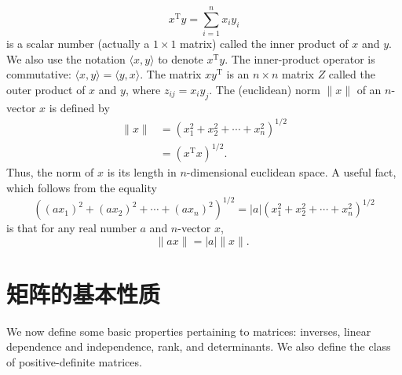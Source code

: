 \documentclass[lang=cn,newtx,10pt,scheme=chinese]{elegantbook}
\begin{document}
$$
x^{\mathrm{T}} y=\sum_{i=1}^n x_i y_i
$$
is a scalar number (actually a $1 \times 1$ matrix) called the inner product of $x$ and $y$. We also use the notation $\langle x, y\rangle$ to denote $x^{\mathrm{T}} y$. The inner-product operator is commutative: $\langle x, y\rangle=\langle y, x\rangle$. The matrix $x y^{\mathrm{T}}$ is an $n \times n$ matrix $Z$ called the outer product of $x$ and $y$, where $z_{i j}=x_i y_j$. The (euclidean) norm $\|x\|$ of an $n$-vector $x$ is defined by
$$
\begin{aligned}
\|x\| & =\left(x_1^2+x_2^2+\cdots+x_n^2\right)^{1 / 2} \\
& =\left(x^{\mathrm{T}} x\right)^{1 / 2} .
\end{aligned}
$$
Thus, the norm of $x$ is its length in $n$-dimensional euclidean space. A useful fact, which follows from the equality
$$
\left(\left(a x_1\right)^2+\left(a x_2\right)^2+\cdots+\left(a x_n\right)^2\right)^{1 / 2}=|a|\left(x_1^2+x_2^2+\cdots+x_n^2\right)^{1 / 2}
$$
is that for any real number $a$ and $n$-vector $x$,
$$
\|a x\|=|a|\|x\| \text {. }
$$

\section{矩阵的基本性质}

We now define some basic properties pertaining to matrices: inverses, linear dependence and independence, rank, and determinants. We also define the class of positive-definite matrices.
\end{document}
